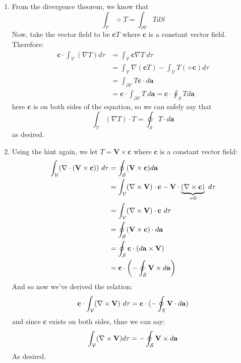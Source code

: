 \documentclass[10pt]{article}
\begin{document}
    \begin{solution}
        \begin{enumerate}[label=(\alph*)]
            \item From the divergence theorem, we know that 
            \[ \int_{\mathcal V} \div T = \int_{\partial \mathcal V} T dS\]
            Now, take the vector field to be $\mathbf cT$ where $\mathbf c$ is a constant vector field. Therefore: 
            \begin{align*}
                \mathbf c \cdot \int_{\mathcal V} (\nabla T) d\tau &= \int_{\mathcal V} \mathbf c \nabla T \ d\tau\\
                &= \int_{\mathcal V} \nabla (\mathbf cT) - \int_{\mathcal V} T(\div \mathbf c) d \tau\\
                &=\int_{\partial \mathcal V} T \mathbf c \cdot d\mathbf a\\
                &= \mathbf c \cdot \int_{\partial \mathcal V} T \ d \mathbf a = \mathbf c \cdot \oint_S T d\mathbf a
            \end{align*}
            here $\mathbf c$ is on both sides of the equation, so we can safely say that 
            \[ \int_{\mathcal V} (\nabla T) \cdot T = \oint_{\mathcal S} T \cdot d\mathbf a\]
            as desired. 
            \item Using the hint again, we let $T = \mathbf V \times \mathbf c$ where $\mathbf c$ is a constant vector field:
            \begin{align*}
                \int_{\mathcal V}(\nabla \cdot (\mathbf {V \times c})) \ d\tau &= \oint_{\mathcal S} (\mathbf{V \times c}) d \mathbf a \\
                &= \int_{\mathcal V} (\nabla \times \mathbf V) \cdot \mathbf c - \mathbf V \cdot \underbrace{(\nabla \times \mathbf c)}_{= 0} \ d\tau\\
                &= \int_{\mathcal V} (\nabla \times \mathbf  V) \cdot \mathbf c \ d\tau\\
                &= \oint_{\mathcal S} (\mathbf {V \times c}) \cdot d\mathbf a\\
                &= \oint_{\mathcal S} \mathbf c \cdot (d\mathbf{a \times V}) \\
                &= \mathbf c \cdot \left(-\oint_{\mathcal S} \mathbf V \times d\mathbf a\right)
            \end{align*}
            And so now we've derived the relation:
            \[ \mathbf c \cdot \int_{\mathcal V} (\nabla \times \mathbf V)\ d\tau = \mathbf c \cdot (-\oint_S \mathbf V \cdot d\mathbf a)\] 
            and since $\mathbf c$ exists on both sides, thne we can say:
            \[ \int_{\mathcal{V}}(\nabla \times\mathbf{V})d\tau = -\oint_{\mathcal{S}}\mathbf{V}\times d\mathbf{a}\] 
            As desired.


\end{enumerate}
\end{solution}
\end{document}
